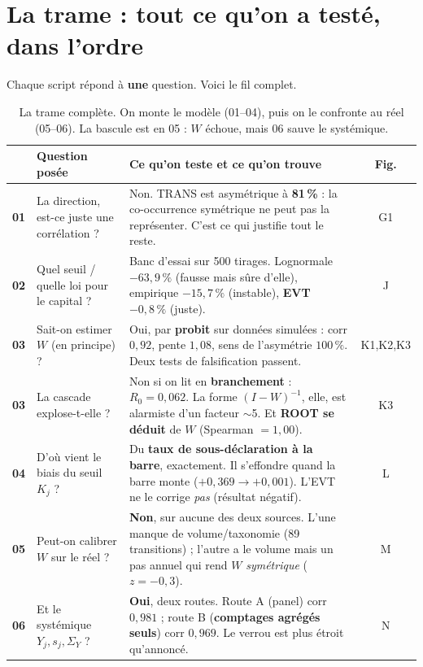 \documentclass[11pt,a4paper]{article}
\newcommand{\Y}{Y}
\begin{document}
\section{La trame : tout ce qu'on a testé, dans l'ordre}
\label{sec:trame}

Chaque script répond à \textbf{une} question. Voici le fil complet.

\begin{table}[htbp]\centering\small
\renewcommand{\arraystretch}{1.3}
\begin{tabularx}{\textwidth}{@{}p{0.7cm} >{\raggedright\arraybackslash}p{3.5cm} >{\raggedright\arraybackslash}X c@{}}
\toprule
& \textbf{Question posée} & \textbf{Ce qu'on teste et ce qu'on trouve} & \textbf{Fig.} \\
\midrule
\textbf{01} & La direction, est-ce juste une corrélation ? &
Non. TRANS est asymétrique à \textbf{81\,\%} : la co-occurrence symétrique ne peut pas la
représenter. C'est ce qui justifie tout le reste. & G1 \\
\addlinespace[3pt]
\textbf{02} & Quel seuil / quelle loi pour le capital ? &
Banc d'essai sur 500 tirages. Lognormale $-63{,}9\,\%$ (fausse mais sûre d'elle), empirique
$-15{,}7\,\%$ (instable), \textbf{EVT $-0{,}8\,\%$} (juste). & J \\
\addlinespace[3pt]
\textbf{03} & Sait-on estimer $W$ (en principe) ? &
Oui, par \textbf{probit} sur données simulées : corr $0{,}92$, pente $1{,}08$, sens de
l'asymétrie $100\,\%$. Deux tests de falsification passent. & K1,K2,K3 \\
\addlinespace[3pt]
\textbf{03} & La cascade explose-t-elle ? &
Non si on lit en \textbf{branchement} : $R_0=0{,}062$. La forme $(I-W)^{-1}$, elle, est
alarmiste d'un facteur $\sim$5. Et \textbf{ROOT se déduit} de $W$ (Spearman $=1{,}00$). & K3 \\
\addlinespace[3pt]
\textbf{04} & D'où vient le biais du seuil $K_j$ ? &
Du \textbf{taux de sous-déclaration à la barre}, exactement. Il s'effondre quand la barre
monte ($+0{,}369 \to +0{,}001$). L'EVT ne le corrige \emph{pas} (résultat négatif). & L \\
\addlinespace[3pt]
\textbf{05} & Peut-on calibrer $W$ sur le réel ? &
\textbf{Non}, sur aucune des deux sources. L'une manque de volume/taxonomie (89 transitions) ;
l'autre a le volume mais un pas annuel qui rend $W$ \emph{symétrique} ($z=-0{,}3$). & M \\
\addlinespace[3pt]
\textbf{06} & Et le systémique $\Y_j,s_j,\Sigma_Y$ ? &
\textbf{Oui}, deux routes. Route A (panel) corr $0{,}981$ ; route B (\textbf{comptages
agrégés seuls}) corr $0{,}969$. Le verrou est plus étroit qu'annoncé. & N \\
\bottomrule
\end{tabularx}
\caption{La trame complète. On monte le modèle (01--04), puis on le confronte au réel
(05--06). La bascule est en 05 : $W$ échoue, mais 06 sauve le systémique.}
\end{table}
\end{document}
